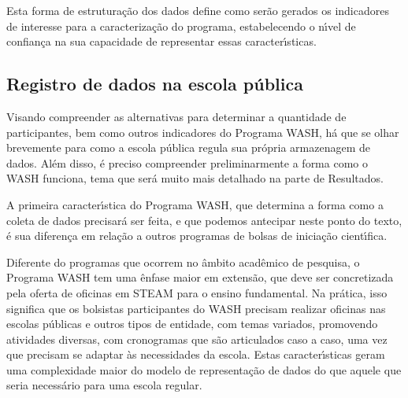 \documentclass[
12pt,		%
openright,	%
twoside,  %
a4paper,			%
chapter=TITLE,		%
english,			%
french,				%
spanish,			%
brazil				%
]{USPSC-classe/USPSC}
\begin{document}
Esta forma de estrutura\c{c}\~ao dos dados define como ser\~ao gerados os indicadores de interesse para a caracteriza\c{c}\~ao do programa, estabelecendo o n\'{\i}vel de confian\c{c}a na sua capacidade de representar essas caracter\'{\i}sticas.









\subsection[Registro de dados na escola p\'ublica]{Registro de dados na escola p\'ublica}\label{Registro de dados na escola p\'ublica}
Visando compreender as alternativas para determinar a quantidade de participantes, bem como outros indicadores do Programa WASH, h\'a que se olhar brevemente para como a escola p\'ublica regula sua pr\'opria armazenagem de dados. Al\'em disso, \'e preciso compreender preliminarmente a forma como o WASH funciona, tema que ser\'a muito mais detalhado na parte de Resultados.









A primeira caracter\'{\i}stica do Programa WASH, que determina a forma como a coleta de dados precisar\'a ser feita, e que podemos antecipar neste ponto do texto, \'e sua diferen\c{c}a em rela\c{c}\~ao a outros programas de bolsas de inicia\c{c}\~ao cient\'{\i}fica.









Diferente do programas que ocorrem no \^ambito acad\^emico de pesquisa, o Programa WASH tem uma \^enfase maior em extens\~ao, que deve ser concretizada pela oferta de oficinas em STEAM para o ensino fundamental. Na pr\'atica, isso significa que os bolsistas participantes do WASH precisam realizar oficinas nas escolas p\'ublicas e outros tipos de entidade, com temas variados, promovendo atividades diversas, com cronogramas que s\~ao articulados caso a caso, uma vez que precisam se adaptar \`as necessidades da escola. Estas caracter\'{\i}sticas geram uma complexidade maior do modelo de representa\c{c}\~ao de dados do que aquele que seria necess\'ario para uma escola regular.
\end{document}
